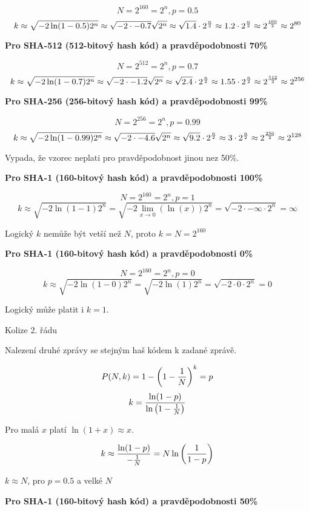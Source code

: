 $$N = 2^{160} = 2^n, p = 0.5$$
$$
k \approx \sqrt{-2 \ln(1 - 0.5) 2^n} \approx \sqrt{-2 \cdot -0.7}\sqrt{2^n}
\approx \sqrt{1.4} \cdot 2^{n \over 2} \approx 1.2 \cdot 2^{n \over 2}
\approx 2^{160 \over 2} \approx 2^{80}
$$

\bigskip\centerline
{\bf Pro SHA-512 (512-bitový hash kód) a pravděpodobnosti 70\%}

$$N = 2^{512} = 2^n, p = 0.7$$
$$
k \approx \sqrt{-2 \ln(1 - 0.7) 2^n} \approx \sqrt{-2 \cdot -1.2}\sqrt{2^n}
\approx \sqrt{2.4} \cdot 2^{n \over 2} \approx 1.55 \cdot 2^{n \over 2}
\approx 2^{512 \over 2} \approx 2^{256}
$$

\bigskip\centerline
{\bf Pro SHA-256 (256-bitový hash kód) a pravděpodobnosti 99\%}

$$N = 2^{256} = 2^n, p = 0.99$$
$$
k \approx \sqrt{-2 \ln(1 - 0.99) 2^n} \approx \sqrt{-2 \cdot -4.6}\sqrt{2^n}
\approx \sqrt{9.2} \cdot 2^{n \over 2} \approx 3 \cdot 2^{n \over 2}
\approx 2^{256 \over 2} \approx 2^{128}
$$

\centerline{Vypada, že vzorec neplati pro pravděpodobnost jinou nez 50\%.}

\bigskip\centerline
{\bf Pro SHA-1 (160-bitový hash kód) a pravděpodobnosti 100\%}

$$N = 2^{160} = 2^n, p = 1$$
$$
k \approx \sqrt{-2 \ln(1 - 1) 2^n} = \sqrt{-2 \lim_{x \rightarrow 0} {(\ln(x))} 2^n}
= \sqrt{-2 \cdot -\infty \cdot 2^n} = \infty
$$

\centerline{Logický $k$ nemůže být vetší než $N$, proto $k = N = 2^{160}$}

\bigskip\centerline
{\bf Pro SHA-1 (160-bitový hash kód) a pravděpodobnosti 0\%}

$$N = 2^{160} = 2^n, p = 0$$
$$
k \approx \sqrt{-2 \ln(1 - 0) 2^n} = \sqrt{-2 \ln(1) 2^n}
= \sqrt{-2 \cdot 0 \cdot 2^n} = 0
$$

\centerline{Logický může platit i $k = 1$.}

\sec Kolize 2. řádu

Nalezení druhé zprávy se stejným haš kódem k zadané zprávě.

$$P(N,k) = 1 - \left( 1 - {1 \over N} \right)^k = p$$
$$k = {\ln(1 - p) \over \ln\left(1 - {1 \over N}\right)}$$

\centerline{Pro malá $x$ platí $\ln(1 + x) \approx x$.}

$$
k \approx {\ln(1 -p) \over -{1 \over N}} = N \ln\left({1 \over 1-p}\right)
$$
\centerline
{$k \approx N$, pro $p = 0.5$ a velké $N$}

\bigskip\centerline
{\bf Pro SHA-1 (160-bitový hash kód) a pravděpodobnosti 50\%}

